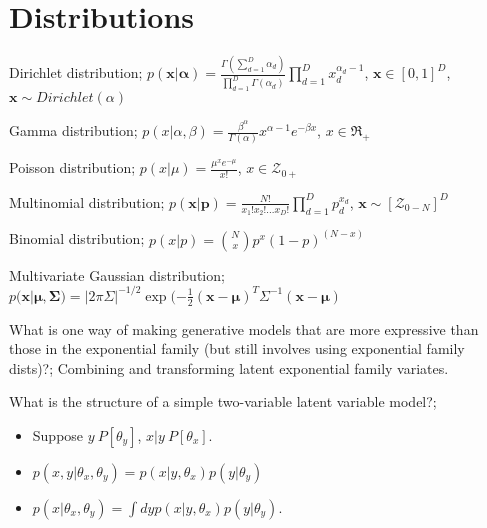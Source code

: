 \documentclass{article}
\begin{document}
	
\section{Distributions}


Dirichlet distribution; $p(\mathbf{x}|\mathbf{\alpha}) = \frac{\Gamma (\sum_{d=1}^{D}\alpha_d)}{\prod_{d=1}^{D}\Gamma(\alpha_d)}\prod_{d=1}^{D}x_d^{\alpha_{d}-1}$, $\mathbf{x}\in [0,1]^D$, $\mathbf{x}\sim Dirichlet(\alpha)$

Gamma distribution; $p(x|\alpha, \beta) = \frac{\beta^{\alpha}}{\Gamma(\alpha)}x^{\alpha-1}e^{-\beta x}$, $x\in \Re_+$

Poisson distribution; $p(x|\mu) = \frac{\mu^xe^{-\mu}}{x!}$, $x\in\mathcal{Z}_{0+}$

Multinomial distribution; $p(\mathbf{x|p})=\frac{N!}{x_1!x_2!...x_D!}\prod_{d=1}^{D}p_d^{x_d}$, $\mathbf{x}\sim [\mathcal{Z}_{0-N}]^D$

Binomial distribution; $p(x|p) = {N\choose x} p^x(1-p)^{(N-x)}$

Multivariate Gaussian distribution; $p(\mathbf{x}|\mathbf{\mu, \Sigma}) = |2\pi\Sigma|^{-1/2}\exp(-\frac{1}{2}(\mathbf{x-\mu})^T\Sigma^{-1}(\mathbf{x-\mu})$

What is one way of making generative models that are more expressive than those in the exponential family (but still involves using exponential family dists)?; Combining and transforming latent exponential family variates.

What is the structure of a simple two-variable latent variable model?; \begin{itemize} \item Suppose $y~P[\theta_y]$, $x|y~P[\theta_x]$.  \item $p(x,y|\theta_x, \theta_y) = p(x|y, \theta_x)p(y|\theta_y)$ \item $p(x|\theta_x, \theta_y) = \int dy p(x|y, \theta_x) p(y|\theta_y)$.  \end{itemize}
\end{document}
